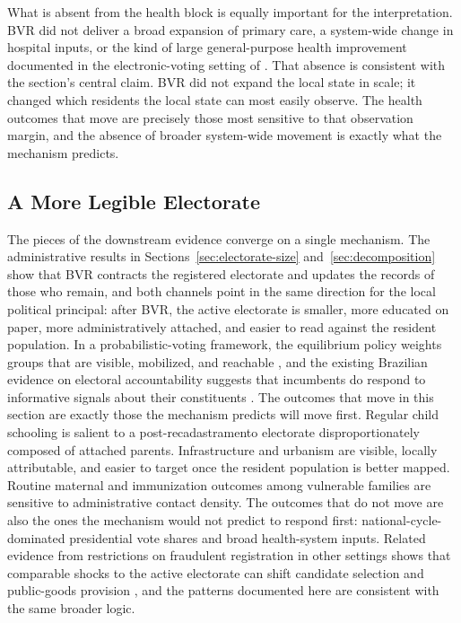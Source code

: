 What is absent from the health block is equally important for the interpretation. BVR did not deliver a broad expansion of primary care, a system-wide change in hospital inputs, or the kind of large general-purpose health improvement documented in the electronic-voting setting of \citet{Fujiwara2015VotingTechnoloPolitica}. That absence is consistent with the section's central claim. BVR did not expand the local state in scale; it changed which residents the local state can most easily observe. The health outcomes that move are precisely those most sensitive to that observation margin, and the absence of broader system-wide movement is exactly what the mechanism predicts.

\subsection{A More Legible Electorate}
\label{ssec:downstream-mechanism}

The pieces of the downstream evidence converge on a single mechanism. The administrative results in Sections~\ref{sec:electorate-size} and~\ref{sec:decomposition} show that BVR contracts the registered electorate and updates the records of those who remain, and both channels point in the same direction for the local political principal: after BVR, the active electorate is smaller, more educated on paper, more administratively attached, and easier to read against the resident population. In a probabilistic-voting framework, the equilibrium policy weights groups that are visible, mobilized, and reachable \citep{Lindbeck1987BalancedBudgetRedistri,Dixit1996TheDeterminSuccess,Hajnal2005WhereTurnoutMatters}, and the existing Brazilian evidence on electoral accountability suggests that incumbents do respond to informative signals about their constituents \citep{ferrazFinan2011}. The outcomes that move in this section are exactly those the mechanism predicts will move first. Regular child schooling is salient to a post-recadastramento electorate disproportionately composed of attached parents. Infrastructure and urbanism are visible, locally attributable, and easier to target once the resident population is better mapped. Routine maternal and immunization outcomes among vulnerable families are sensitive to administrative contact density. The outcomes that do not move are also the ones the mechanism would not predict to respond first: national-cycle-dominated presidential vote shares and broad health-system inputs. Related evidence from restrictions on fraudulent registration in other settings shows that comparable shocks to the active electorate can shift candidate selection and public-goods provision \citep{Karim2025VoterBuyingPolitici}, and the patterns documented here are consistent with the same broader logic.

